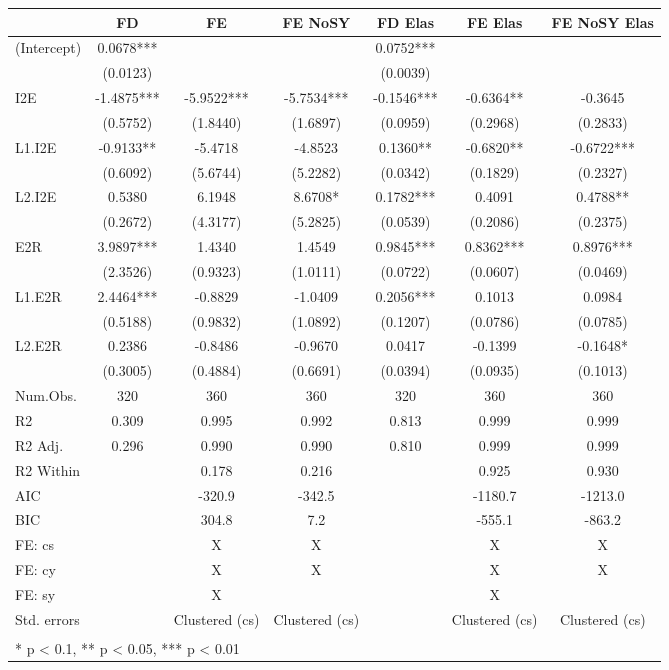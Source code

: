 \begin{table}[H]
\centering
\begin{tabular}[t]{lcccccc}
\toprule
  & FD & FE & FE NoSY & FD Elas & FE Elas & FE NoSY Elas\\
\midrule
(Intercept) & 0.0678*** &  &  & 0.0752*** &  & \\
 & (0.0123) &  &  & (0.0039) &  & \\
I2E & -1.4875*** & -5.9522*** & -5.7534*** & -0.1546*** & -0.6364** & -0.3645\\
 & (0.5752) & (1.8440) & (1.6897) & (0.0959) & (0.2968) & (0.2833)\\
L1.I2E & -0.9133** & -5.4718 & -4.8523 & 0.1360** & -0.6820** & -0.6722***\\
 & (0.6092) & (5.6744) & (5.2282) & (0.0342) & (0.1829) & (0.2327)\\
L2.I2E & 0.5380 & 6.1948 & 8.6708* & 0.1782*** & 0.4091 & 0.4788**\\
 & (0.2672) & (4.3177) & (5.2825) & (0.0539) & (0.2086) & (0.2375)\\
E2R & 3.9897*** & 1.4340 & 1.4549 & 0.9845*** & 0.8362*** & 0.8976***\\
 & (2.3526) & (0.9323) & (1.0111) & (0.0722) & (0.0607) & (0.0469)\\
L1.E2R & 2.4464*** & -0.8829 & -1.0409 & 0.2056*** & 0.1013 & 0.0984\\
 & (0.5188) & (0.9832) & (1.0892) & (0.1207) & (0.0786) & (0.0785)\\
L2.E2R & 0.2386 & -0.8486 & -0.9670 & 0.0417 & -0.1399 & -0.1648*\\
 & (0.3005) & (0.4884) & (0.6691) & (0.0394) & (0.0935) & (0.1013)\\
\midrule
Num.Obs. & 320 & 360 & 360 & 320 & 360 & 360\\
R2 & 0.309 & 0.995 & 0.992 & 0.813 & 0.999 & 0.999\\
R2 Adj. & 0.296 & 0.990 & 0.990 & 0.810 & 0.999 & 0.999\\
R2 Within &  & 0.178 & 0.216 &  & 0.925 & 0.930\\
AIC &  & -320.9 & -342.5 &  & -1180.7 & -1213.0\\
BIC &  & 304.8 & 7.2 &  & -555.1 & -863.2\\
FE: cs &  & X & X &  & X & X\\
FE: cy &  & X & X &  & X & X\\
FE: sy &  & X &  &  & X & \\
Std. errors &  & Clustered (cs) & Clustered (cs) &  & Clustered (cs) & Clustered (cs)\\
\bottomrule
\multicolumn{7}{l}{\textsuperscript{} * p < 0.1, ** p < 0.05, *** p < 0.01}\\
\end{tabular}
\end{table}

